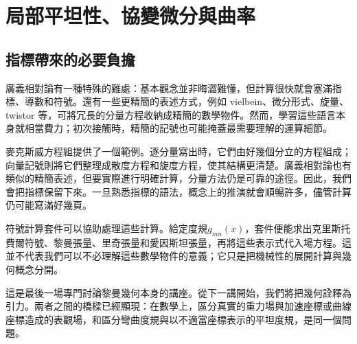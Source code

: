 \chapter{局部平坦性、協變微分與曲率}


\section{指標帶來的必要負擔}

廣義相對論有一種特殊的難處：基本觀念並非晦澀難懂，但計算很快就會塞滿指標、導數和符號。還有一些更精簡的表述方式，例如 vielbein、微分形式、旋量、twistor 等，可將冗長的分量方程收納成精簡的數學物件。然而，學習這些語言本身就相當費力；初次接觸時，精簡的記號也可能掩蓋最需要理解的運算細節。

麥克斯威方程組提供了一個範例。逐分量寫出時，它們由好幾個分立的方程組成；向量記號則將它們整理成散度方程和旋度方程，使其結構更清楚。廣義相對論也有類似的精簡表述，但要實際進行明確計算，分量方法仍是可靠的途徑。因此，我們會把指標保留下來。一旦熟悉指標的語法，概念上的推演就會順暢許多，儘管計算仍可能寫滿好幾頁。

符號計算套件可以協助處理這些計算。給定度規\(g_{mn}(x)\)，套件便能求出克里斯托費爾符號、黎曼張量、里奇張量和愛因斯坦張量，再將這些表示式代入場方程。這並不代表我們可以不必理解這些數學物件的意義；它只是把機械性的展開計算與幾何概念分開。

\begin{classroomqa}
\end{classroomqa}

這是最後一場專門討論黎曼幾何本身的講座。從下一講開始，我們將把幾何詮釋為引力。兩者之間的橋樑已經顯現：在數學上，區分真實的重力場與加速座標或曲線座標造成的表觀場，和區分彎曲度規與以不適當座標表示的平坦度規，是同一個問題。

